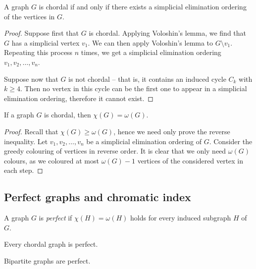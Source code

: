 
\begin{izrek}
A graph $G$ is chordal if and only if there exists a simplicial
elimination ordering of the vertices in $G$.
\end{izrek}

\begin{proof}
Suppose first that $G$ is chordal. Applying Voloshin's lemma, we
find that $G$ has a simplicial vertex $v_1$. We can then apply
Voloshin's lemma to $G \setminus v_1$. Repeating this process $n$
times, we get a simplicial elimination ordering
$v_1, v_2, \dots, v_n$.

Suppose now that $G$ is not chordal -- that is, it contains an
induced cycle $C_k$ with $k \geq 4$. Then no vertex in this cycle
can be the first one to appear in a simplicial elimination
ordering, therefore it cannot exist.
\end{proof}

\begin{izrek}
If a graph $G$ is chordal, then $\chi(G) = \omega(G)$.
\end{izrek}

\begin{proof}
Recall that $\chi(G) \geq \omega(G)$, hence we need only prove the
reverse inequality. Let $v_1, v_2, \dots, v_n$ be a simplicial
elimination ordering of $G$. Consider the greedy colouring of
vertices in reverse order. It is clear that we only need
$\omega(G)$ colours, as we coloured at most $\omega(G)-1$ vertices
of the considered vertex in each step.
\end{proof}

\newpage

\subsection{Perfect graphs and chromatic index}

\begin{definicija}
A graph $G$ is \emph{perfect} if
$\chi(H) = \omega(H)$ holds for every induced subgraph $H$ of $G$.
\end{definicija}

\begin{izrek}
Every chordal graph is perfect.
\end{izrek}

\obvs

\begin{izrek}
Bipartite graphs are perfect.
\end{izrek}

